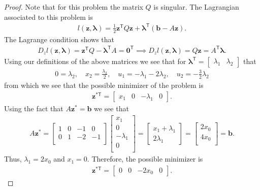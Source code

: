 \documentclass[12pt]{article}
\theoremstyle{definition}
\newcommand{\vc}[1]{\boldsymbol{#1}}
\newcommand{\tran}{\mathsf{T}}
\begin{document}
\begin{proof}
  Note that for this problem the matrix $Q$ is singular. The Lagrangian associated
  to this problem is
  \begin{align*}
    l(\vc{z}, \vc{\lambda}) = \frac{1}{2}\vc{z}^\tran Q \vc{z} + \vc{\lambda}^\tran(\vc{b} - A \vc{z}).
  \end{align*}
  The Lagrange condition shows that
  \begin{align*}
    D_z l(\vc{z}, \vc{\lambda}) = \vc{z}^\tran Q - \vc{\lambda}^\tran A = \vc{0}^\tran \implies
    D_z l(\vc{z}, \vc{\lambda}) = Q\vc{z}  = A^\tran \vc{\lambda}.
  \end{align*}
  Using our definitions of the above matrices we see that for $\vc{\lambda}^\tran = \begin{bmatrix}\lambda_1 & \lambda_2\end{bmatrix}$
  that
  \begin{align*}
    0 = \lambda_2, \quad
    x_2 = \frac{\lambda_2}{2}, \quad
    u_1 = -\lambda_1-2\lambda_2, \quad
    u_2 = -\frac{3}{2}\lambda_2
  \end{align*}
  from which we see that the possible minimizer of the problem is
  \begin{align*}
    \vc{z}^{*\tran} =
    \begin{bmatrix}
      x_1 &
      0 &
      -\lambda_1 &
      0
    \end{bmatrix}.
  \end{align*}
  Using the fact that $A\vc{z}^{*} = \vc{b}$ we see that
  \begin{align*}
    A\vc{z}^{*}=
       \begin{bmatrix}
      1 & 0 & -1 & 0 \\
      0 & 1 & -2 & -1 \\
   \end{bmatrix}
    \begin{bmatrix}
      x_1 \\
      0 \\
      -\lambda_1 \\
      0\\
    \end{bmatrix}
    =\begin{bmatrix}
      x_1 + \lambda_1 \\
      2\lambda_1
    \end{bmatrix}
    =\begin{bmatrix}
     2x_0 \\
     4x_0 \\
   \end{bmatrix} = \vc{b}.
  \end{align*}
  Thus, $\lambda_1 = 2x_0$ and $x_1 = 0$. Therefore, the possible minimizer is
  \begin{align}\label{minimizer}
    \vc{z}^{*\tran} =
    \begin{bmatrix}
      0 &
      0 &
      -2x_0 &
      0
    \end{bmatrix}.
  \end{align}


\end{proof}
\end{document}
